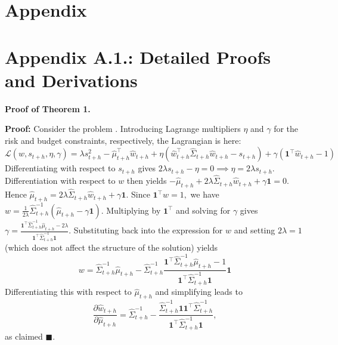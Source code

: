 \section*{Appendix}
\section*{Appendix A.1.: Detailed Proofs and Derivations} \label{Appendix:A1}

\noindent\textbf{Proof of Theorem 1.} \label{Appendix:A1}

\textbf{Proof: } Consider the problem . Introducing Lagrange multipliers $\eta$ and $\gamma$ for the risk and budget constraints, respectively, the Lagrangian is here: 
\begin{equation}
    \mathcal{L}(w,s_{t+h},\eta,\gamma)=\lambda s_{t+h}^2 - \hat{\mu}_{t+h}^{\top} \hat{w}_{t+h} + \eta(\hat{w}_{t+h}^{\top}\hat{\Sigma}_{t+h} \hat{w}_{t+h} - s_{t+h}) + \gamma(\mathbf{1}^{\top} \hat{w}_{t+h} -1)
\end{equation}
Differentiating with respect to $s_{t+h}$ gives $2\lambda s_{t+h}-\eta =0 \implies \eta=2\lambda s_{t+h}.$ Differentiation with respect to $w$ then yields $-\hat{\mu}_{t+h} + 2\lambda \hat{\Sigma}_{t+h} \hat{w}_{t+h} + \gamma \mathbf{1}=0.$ Hence $\hat{\mu}_{t+h} = 2\lambda \hat{\Sigma}_{t+h} \hat{w}_{t+h} + \gamma \mathbf{1}$. Since $\mathbf{1}^{\top}w=1,$ we have $w = \tfrac{1}{2\lambda}\hat{\Sigma}_{t+h}^{-1}(\hat{\mu}_{t+h}-\gamma\mathbf{1}).$ Multiplying by $\mathbf{1}^{\top}$ and solving for $\gamma$ gives $\gamma = \tfrac{\mathbf{1}^{\top}\hat{\Sigma}_{t+h}^{-1}\hat{\mu}_{t+h}-2\lambda}{\mathbf{1}^{\top}\hat{\Sigma}_{t+h}^{-1}\mathbf{1}}.$  Substituting back into the expression for $w$ and setting $2\lambda=1$ (which does not affect the structure of the solution) yields
\begin{equation}
    w = \hat{\Sigma}_{t+h}^{-1}\hat{\mu}_{t+h}-\hat{\Sigma}_{t+h}^{-1}\frac{\mathbf{1}^{\top}\hat{\Sigma}_{t+h}^{-1}\hat{\mu}_{t+h}-1}{\mathbf{1}^{\top}\hat{\Sigma}_{t+h}^{-1}\mathbf{1}}\mathbf{1}
\end{equation}
Differentiating this with respect to $\hat{\mu}_{t+h}$ and simplifying leads to
\begin{equation}
    \frac{\partial \hat{w}_{t+h}}{\partial \hat{\mu}_{t+h}} = \hat{\Sigma}_{t+h}^{-1}-\frac{\hat{\Sigma}_{t+h}^{-1}\mathbf{1}\mathbf{1}^{\top}\hat{\Sigma}_{t+h}^{-1}}{\mathbf{1}^{\top}\hat{\Sigma}_{t+h}^{-1}\mathbf{1}},
\end{equation}
as claimed $\blacksquare$.

